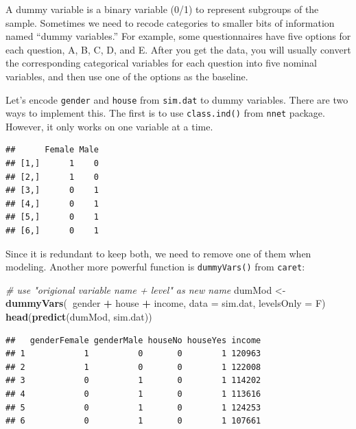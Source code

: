 \documentclass[12pt,]{krantz}
\makeatletter
\newenvironment{Shaded}{\begin{snugshade}}{\end{snugshade}}
\newcommand{\CommentTok}[1]{\textcolor[rgb]{0.37,0.37,0.37}{\textit{#1}}}
\newcommand{\DataTypeTok}[1]{\textcolor[rgb]{0.27,0.27,0.27}{#1}}
\newcommand{\KeywordTok}[1]{\textcolor[rgb]{0.27,0.27,0.27}{\textbf{#1}}}
\newcommand{\NormalTok}[1]{#1}
\newcommand{\OperatorTok}[1]{\textcolor[rgb]{0.43,0.43,0.43}{\textbf{#1}}}
\newcommand{\StringTok}[1]{\textcolor[rgb]{0.5,0.5,0.5}{#1}}
\newenvironment{kframe}{%
\medskip{}
\setlength{\fboxsep}{.8em}
 \def\at@end@of@kframe{}%
 \ifinner\ifhmode%
  \def\at@end@of@kframe{\end{minipage}}%
  \begin{minipage}{\columnwidth}%
 \fi\fi%
 \def\FrameCommand##1{\hskip\@totalleftmargin \hskip-\fboxsep
 \colorbox{shadecolor}{##1}\hskip-\fboxsep
     \hskip-\linewidth \hskip-\@totalleftmargin \hskip\columnwidth}%
 \MakeFramed {\advance\hsize-\width
   \@totalleftmargin\z@ \linewidth\hsize
   \@setminipage}}%
 {\par\unskip\endMakeFramed%
 \at@end@of@kframe}
\renewenvironment{Shaded}{\begin{kframe}}{\end{kframe}}
\makeatother
\begin{document}
A dummy variable is a binary variable (0/1) to represent subgroups of the sample. Sometimes we need to recode categories to smaller bits of information named ``dummy variables.'' For example, some questionnaires have five options for each question, A, B, C, D, and E. After you get the data, you will usually convert the corresponding categorical variables for each question into five nominal variables, and then use one of the options as the baseline.

Let's encode \texttt{gender} and \texttt{house} from \texttt{sim.dat} to dummy variables. There are two ways to implement this. The first is to use \texttt{class.ind()} from \texttt{nnet} package. However, it only works on one variable at a time.

\begin{Shaded}
\end{Shaded}

\begin{verbatim}
##      Female Male
## [1,]      1    0
## [2,]      1    0
## [3,]      0    1
## [4,]      0    1
## [5,]      0    1
## [6,]      0    1
\end{verbatim}

Since it is redundant to keep both, we need to remove one of them when modeling. Another more powerful function is \texttt{dummyVars()} from \texttt{caret}:

\begin{Shaded}
\begin{Highlighting}[]
\CommentTok{# use "origional variable name + level" as new name}
\NormalTok{dumMod <-}\StringTok{ }\KeywordTok{dummyVars}\NormalTok{(}\OperatorTok{~}\NormalTok{gender }\OperatorTok{+}\StringTok{ }\NormalTok{house }\OperatorTok{+}\StringTok{ }\NormalTok{income, }
                    \DataTypeTok{data =}\NormalTok{ sim.dat, }
                    \DataTypeTok{levelsOnly =}\NormalTok{ F)}
\KeywordTok{head}\NormalTok{(}\KeywordTok{predict}\NormalTok{(dumMod, sim.dat))}
\end{Highlighting}
\end{Shaded}

\begin{verbatim}
##   genderFemale genderMale houseNo houseYes income
## 1            1          0       0        1 120963
## 2            1          0       0        1 122008
## 3            0          1       0        1 114202
## 4            0          1       0        1 113616
## 5            0          1       0        1 124253
## 6            0          1       0        1 107661
\end{verbatim}
\end{document}
